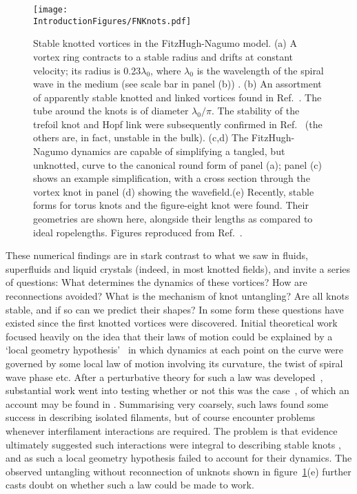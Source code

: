 \begin{figure}[htbp]
\centering
\texttt{[image: \\IntroductionFigures/FNKnots.pdf]}
\caption[Knotted vortices in the FitzHugh-Nagumo model.]{Stable knotted vortices in the FitzHugh-Nagumo model. (a) A vortex ring contracts to a stable radius and drifts at constant velocity; its radius is 0.23$\lambda_0$, where $\lambda_0$ is the wavelength of the spiral wave in the medium (see scale bar in panel (b)) . (b) An assortment of apparently stable knotted and linked vortices found in Ref.~\citep{Henze1993}. The tube around the knots is of diameter $\lambda_0/\pi$. The stability of the trefoil knot and Hopf link were subsequently confirmed in Ref.~\citep{Sutcliffe2003} (the others are, in fact, unstable in the bulk). (c,d) The FitzHugh-Nagumo dynamics are capable of simplifying a tangled, but unknotted, curve to the canonical round form of panel (a); panel (c) shows an example simplification, with a cross section through the vortex knot in panel (d) showing the wavefield.(e) Recently, stable forms for torus knots and the figure-eight knot were found. Their geometries are shown here, alongside their lengths as compared to ideal ropelengths. Figures reproduced from Ref.~\citep{Winfree1990,WinfreeChapter,Maucher2016,Maucher2017}.}
\label{fig:FNKnots}
\end{figure}
These numerical findings are in stark contrast to what we saw in fluids, superfluids and liquid crystals (indeed, in most knotted fields), and invite a series of questions: What determines the dynamics of these vortices? How are reconnections avoided? What is the mechanism of knot untangling? Are all knots stable, and if so can we predict their shapes? In some form these questions have existed since the first knotted vortices were discovered. Initial theoretical work focused heavily on the idea that their laws of motion could be explained by a `local geometry hypothesis'~\citep{Keener1988,Keener1992,Biktashev1994,Henry2002,Echebarria2006,Dierckx2010} in which dynamics at each point on the curve were governed by some local law of motion involving its curvature, the twist of spiral wave phase etc. After a perturbative theory for such a law was developed~\citep{Keener1988,Keener1992, Biktashev1994}, substantial work went into testing whether or not this was the case~\citep{Winfree1990,Henze1993}, of which an account may be found in \citep{WinfreeChapter}. Summarising very coarsely, such laws found some success in describing isolated filaments, but of course encounter problems whenever interfilament interactions are required. The problem is that evidence ultimately suggested such interactions were integral to describing stable knots \citep{Henze1993,WinfreeChapter}, and as such a local geometry hypothesis failed to account for their dynamics. The observed untangling without reconnection of unknots shown in figure~\ref{fig:FNKnots}(e) \citep{Maucher2016} further casts doubt on whether such a law could be made to work. 

